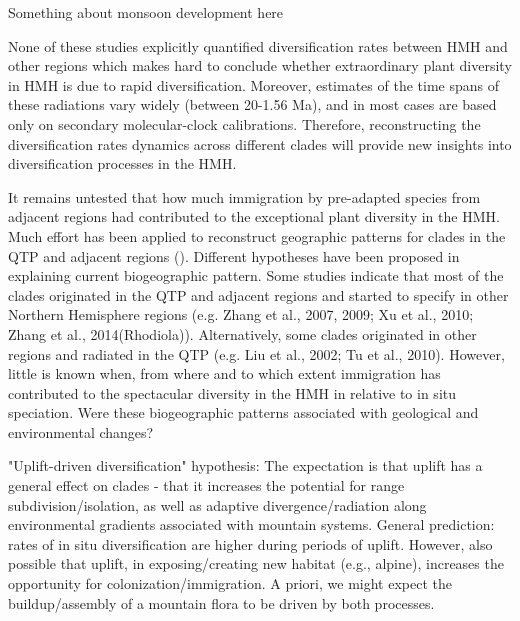 Something about monsoon development here


None of these studies explicitly quantified diversification rates between HMH and other regions which makes hard to conclude whether extraordinary plant diversity in HMH is due to rapid diversification. Moreover, estimates of the time spans of these radiations vary widely (between 20-1.56 Ma), and in most cases are based only on secondary molecular-clock calibrations. Therefore, reconstructing the diversification rates dynamics across different clades will provide new insights into diversification processes in the HMH.


It remains untested that how much immigration by pre-adapted species from adjacent regions had contributed to the exceptional plant diversity in the HMH. Much effort has been applied to reconstruct geographic patterns for clades in the QTP and adjacent regions (). Different hypotheses have been proposed in explaining current biogeographic pattern. Some studies indicate that most of the clades originated in the QTP and adjacent regions and started to specify in other Northern Hemisphere regions (e.g. Zhang et al., 2007, 2009; Xu et al., 2010; Zhang et al., 2014(Rhodiola)). Alternatively, some clades originated in other regions and radiated in the QTP (e.g. Liu et al., 2002; Tu et al., 2010). However, little is known when, from where and to which extent immigration has contributed to the spectacular diversity in the HMH in relative to in situ speciation. Were these biogeographic patterns associated with geological and environmental changes?

"Uplift-driven diversification" hypothesis: The expectation is that uplift has a general effect on clades - that it increases the potential for range subdivision/isolation, as well as adaptive divergence/radiation along environmental gradients associated with mountain systems. General prediction: rates of in situ diversification are higher during periods of uplift. However, also possible that uplift, in exposing/creating new habitat (e.g., alpine), increases the opportunity for colonization/immigration. A priori, we might expect the buildup/assembly of a mountain flora to be driven by both processes.

